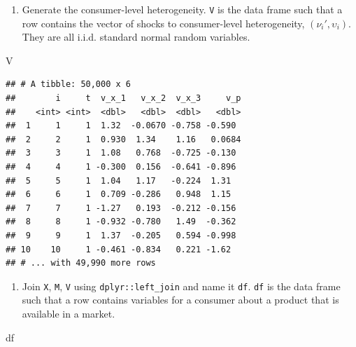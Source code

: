 \documentclass[
]{book}
\newenvironment{Shaded}{\begin{snugshade}}{\end{snugshade}}
\newcommand{\NormalTok}[1]{#1}
\providecommand{\tightlist}{%
  \setlength{\itemsep}{0pt}\setlength{\parskip}{0pt}}
\begin{document}
\begin{enumerate}
\def\labelenumi{\arabic{enumi}.}
\setcounter{enumi}{3}
\tightlist
\item
  Generate the consumer-level heterogeneity. \texttt{V} is the data frame such that a row contains the vector of shocks to consumer-level heterogeneity, \((\nu_{i}', \upsilon_i)\). They are all i.i.d. standard normal random variables.
\end{enumerate}

\begin{Shaded}
\begin{Highlighting}[]
\NormalTok{V}
\end{Highlighting}
\end{Shaded}

\begin{verbatim}
## # A tibble: 50,000 x 6
##        i     t  v_x_1   v_x_2  v_x_3     v_p
##    <int> <int>  <dbl>   <dbl>  <dbl>   <dbl>
##  1     1     1  1.32  -0.0670 -0.758 -0.590 
##  2     2     1  0.930  1.34    1.16   0.0684
##  3     3     1  1.08   0.768  -0.725 -0.130 
##  4     4     1 -0.300  0.156  -0.641 -0.896 
##  5     5     1  1.04   1.17   -0.224  1.31  
##  6     6     1  0.709 -0.286   0.948  1.15  
##  7     7     1 -1.27   0.193  -0.212 -0.156 
##  8     8     1 -0.932 -0.780   1.49  -0.362 
##  9     9     1  1.37  -0.205   0.594 -0.998 
## 10    10     1 -0.461 -0.834   0.221 -1.62  
## # ... with 49,990 more rows
\end{verbatim}

\begin{enumerate}
\def\labelenumi{\arabic{enumi}.}
\setcounter{enumi}{4}
\tightlist
\item
  Join \texttt{X}, \texttt{M}, \texttt{V} using \texttt{dplyr::left\_join} and name it \texttt{df}. \texttt{df} is the data frame such that a row contains variables for a consumer about a product that is available in a market.
\end{enumerate}

\begin{Shaded}
\begin{Highlighting}[]
\NormalTok{df}
\end{Highlighting}
\end{Shaded}
\end{document}
